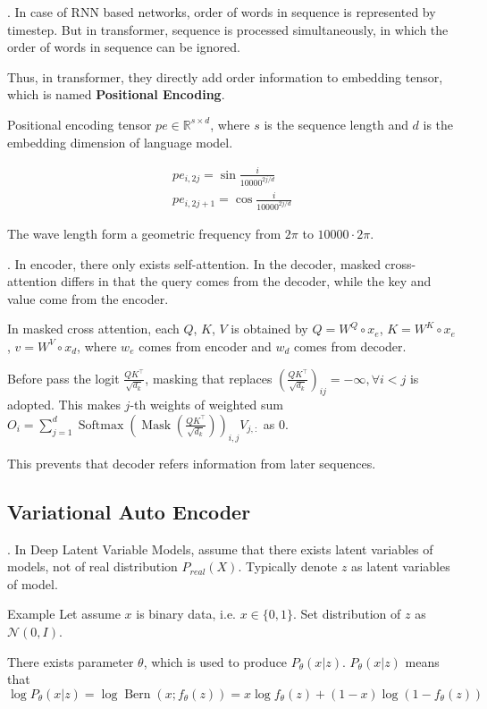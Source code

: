\documentclass[8pt]{beamer}
\newcommand{\mbb}[1]{\mathbb{#1}}
\newcommand{\mc}[1]{\mathcal{#1}}
\newcommand{\tb}[1]{\textbf{#1}}
\newcommand{\Softmax}[1]{\operatorname{Softmax}\!\left(#1\right)}
\begin{document}
\begin{frame}{.}
    In case of RNN based networks, order of words in sequence is represented by timestep.
    But in transformer, sequence is processed simultaneously, in which the order of words in sequence can be ignored.

    Thus, in transformer, they directly add order information to embedding tensor, which is named \tb{Positional Encoding}.

    Positional encoding tensor $pe \in \mbb{R}^{s \times d}$, where $s$ is the sequence length and $d$ is the embedding dimension of language model.

    \[
    \begin{gathered}
        pe_{i,2j} = \sin{\frac{i}{10000^{2j/d}}} \\
        pe_{i,2j+1} = \cos{\frac{i}{10000^{2j/d}}}
    \end{gathered}
    \]

    The wave length form a geometric frequency from $2\pi$ to $10000 \cdot 2\pi $.
\end{frame}

\begin{frame}{.}
    In encoder, there only exists self-attention.
    In the decoder, masked cross-attention differs in that the query comes from the decoder, while the key and value come from the encoder.

    In masked cross attention, each $Q$, $K$, $V$ is obtained by $Q = W^Q \circ x_e$, $K = W^K \circ x_e$, $v = W^V \circ x_d$, where $w_e$ comes from encoder and $w_d$ comes from decoder.

    Before pass the logit $\frac{QK^\top}{\sqrt{d_k}}$, masking that replaces $\left(\frac{QK^\top}{\sqrt{d_k}}\right)_{ij} = -\infty, \forall i<j$ is adopted.
    This makes $j$-th weights of weighted sum $O_i = \sum_{j=1}^d \Softmax{\operatorname{Mask}(\frac{QK^\top}{\sqrt{d_k}})}_{i,j} V_{j,:}$ as $0$.

    This prevents that decoder refers information from later sequences.

\end{frame}

\subsection{Variational Auto Encoder}

\begin{frame}{.}
    In Deep Latent Variable Models, assume that there exists latent variables of models, not of real distribution $P_{real}(X)$. Typically denote $z$ as latent variables of model.

    \begin{block}{Example}
        Let assume $x$ is binary data, i.e. $x \in \{0, 1\}$. Set distribution of $z$ as $\mc{N}(0, I)$.

        There exists parameter $\theta$, which is used to produce $P_\theta(x|z)$. 
        $P_\theta (x|z)$ means that 
        \[
            \log{P_\theta(x|z)} = \log{\operatorname{Bern}(x; f_\theta(z))} = x\log{f_\theta(z)} + (1-x) \log{(1 - f_\theta(z))}
        \]
    \end{block}
\end{frame}
\end{document}
